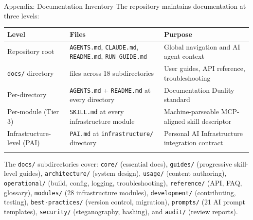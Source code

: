 \documentclass[
  ignorenonframetext,
]{beamer}
\author{\texorpdfstring{}{}}
\date{}
\newcounter{none} %
\begin{document}
\begin{frame}
\newpage
\end{frame}

\begin{frame}{Appendix: Documentation
Inventory}
\protect{}\label{appendix-docs}
The repository maintains documentation at three levels:

\begin{table}[h]
\caption{Documentation inventory across the four-layer documentation architecture, from repository-wide system files to per-module skill descriptors.}
\label{tab:documentation-inventory}
\end{table}

{\def\LTcaptype{none} %
\begin{longtable}[]{@{}
  >{\raggedright\arraybackslash}p{}
  >{\centering\arraybackslash}p{}
  >{\raggedright\arraybackslash}p{}@{}}
\toprule\noalign{}
\begin{minipage}[b]{\linewidth}\raggedright
Level
\end{minipage} & \begin{minipage}[b]{\linewidth}\centering
Files
\end{minipage} & \begin{minipage}[b]{\linewidth}\raggedright
Purpose
\end{minipage} \\
\midrule\noalign{}
\endhead
Repository root & \texttt{AGENTS.md}, \texttt{CLAUDE.md},
\texttt{README.md}, \texttt{RUN\_GUIDE.md} & Global navigation and AI
agent context \\
\texttt{docs/} directory & 390 files across 18 subdirectories & User
guides, API reference, troubleshooting \\
Per-directory & \texttt{AGENTS.md} + \texttt{README.md} at every
directory & Documentation Duality standard \\
Per-module (Tier 3) & \texttt{SKILL.md} at every infrastructure module &
Machine-parseable MCP-aligned skill descriptor \\
Infrastructure-level (PAI) & \texttt{PAI.md} at \texttt{infrastructure/}
directory & Personal AI Infrastructure integration contract \\
\bottomrule\noalign{}
\end{longtable}
}

The \texttt{docs/} subdirectories cover: \texttt{core/} (essential
docs), \texttt{guides/} (progressive skill-level guides),
\texttt{architecture/} (system design), \texttt{usage/} (content
authoring), \texttt{operational/} (build, config, logging,
troubleshooting), \texttt{reference/} (API, FAQ, glossary),
\texttt{modules/} (28 infrastructure modules), \texttt{development/}
(contributing, testing), \texttt{best-practices/} (version control,
migration), \texttt{prompts/} (21 AI prompt templates),
\texttt{security/} (steganography, hashing), and \texttt{audit/} (review
reports).


\end{frame}
\end{document}
